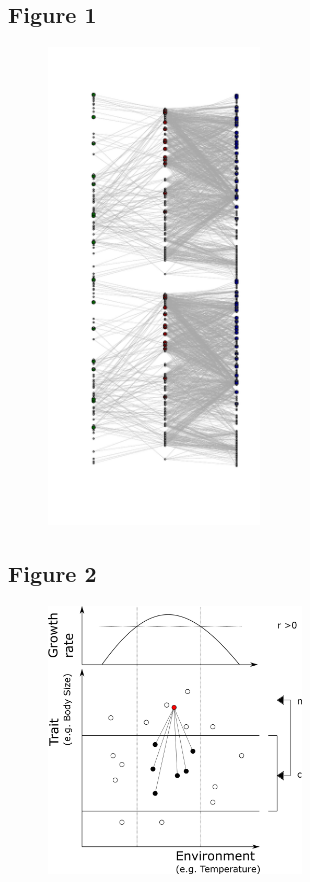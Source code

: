 \documentclass[12pt]{article}
\begin{document}
\subsection*{Figure 1}

\begin{figure}[ht!]
\centering\includegraphics[width=0.5\textwidth]{figures/metaweb_sampling}
\end{figure}

\newpage

\subsection*{Figure 2}

\begin{figure}[ht!]
\centering\includegraphics[width=0.6\textwidth]{figures/integrated_niche}
\end{figure}
\end{document}
